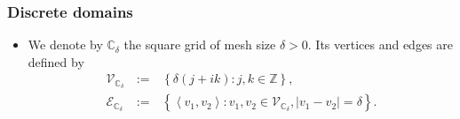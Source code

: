\documentclass[oneside,english]{amsart}
\numberwithin{equation}{section}
\numberwithin{figure}{section}
\theoremstyle{plain}
\theoremstyle{plain}
\theoremstyle{plain}
\theoremstyle{plain}
\theoremstyle{plain}
\theoremstyle{definition}
\theoremstyle{remark}
\begin{document}
\subsubsection{Discrete domains\label{sub:discrete-domains}}
\begin{itemize}
\item We denote by $\mathbb{C}_{\delta}$ the square grid of mesh size $\delta>0$.
Its vertices and edges are defined by 
\begin{eqnarray*}
\mathcal{V}_{\mathbb{C}_{\delta}} & \,:=\, & \left\{ \delta\left(j+ik\right):j,k\in\mathbb{Z}\right\} ,\\
\mathcal{E}_{\mathbb{C}_{\delta}} & \,:=\, & \left\{ \left\langle v_{1},v_{2}\right\rangle :v_{1},v_{2}\in\mathcal{V}_{\mathbb{C}_{\delta}},\left|v_{1}-v_{2}\right|=\delta\right\} .
\end{eqnarray*}


\end{itemize}
\end{document}
